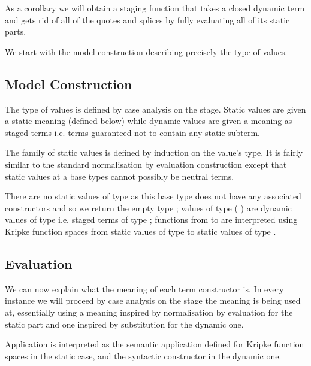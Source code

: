 As a corollary we will obtain a staging function
that takes a closed dynamic term and gets rid of all of
the quotes and splices by fully
evaluating all of its static parts.


We start with the model construction describing precisely
the type of values.

\subsection{Model Construction}\label{sec:stagingmodel}

The type of values is defined by case analysis on the stage.
%
Static values are given a static meaning (defined below)
while dynamic values are given a meaning as staged terms
i.e. terms guaranteed not to contain any static subterm.


The family of static values is defined by induction on
the value's type. It is fairly similar to the standard
normalisation by evaluation construction
except that static values at a base types cannot possibly
be neutral terms.

\begin{AgdaSuppressSpace}
\end{AgdaSuppressSpace}

There are no static values of type  as this base type does
not have any associated constructors and so we return the empty type ;
values of type ( ) are dynamic values of type 
i.e. staged terms of type ;
functions from  to  are interpreted using Kripke function
spaces from static values of type  to static values of type .

\subsection{Evaluation}

We can now explain what the meaning of each term constructor is.
In every instance we will proceed by case analysis on the
stage the meaning is being used at, essentially using a
meaning inspired by normalisation by evaluation for the static
part and one inspired by substitution for the dynamic one.

Application is interpreted as the semantic application defined
for Kripke function spaces in the static case, and the syntactic
 constructor in the dynamic one.

